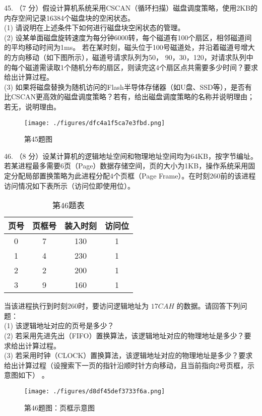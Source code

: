 45. （7 分）假设计算机系统采用CSCAN（循环扫描）磁盘调度策略，使用2KB的内存空间记录16384个磁盘块的空闲状态。 \\
(1) 请说明在上述条件下如何进行磁盘块空闲状态的管理。 \\
(2) 设某单面磁盘旋转速度为每分钟6000转，每个磁道有100个扇区，相邻磁道间的平均移动时间为1ms。
若在某时刻，磁头位于100号磁道处，并沿着磁道号增大的方向移动（如下图所示），磁道号请求队列为50，
90，30，120，对请求队列中的每个磁道需读取1个随机分布的扇区，则读完这4个扇区点共需要多少时间？要求给出计算过程。 \\
(3) 如果将磁盘替换为随机访问的Flash半导体存储器（如U盘、SSD等），是否有比CSCAN更高效的磁盘调度策略？若有，给出磁盘调度策略的名称并说明理由；若无，说明理由。
\begin{figure}[ht]
\centering
\texttt{[image: ./figures/dfc4a1f5ca7e3fbd.png]}
\caption{第45题图} \label{fig_CSN10_7}
\end{figure}

46. （8 分）设某计算机的逻辑地址空间和物理地址空间均为64KB，按字节编址。若某进程最多需要6页（Page）数据存储空间，页的大小为1KB，操作系统采用固定分配局部置换策略为此进程分配4个页框（Page Frame）。在时刻260前的该进程访问情况如下表所示（访问位即使用位）。 \\
\begin{table}[ht]
\centering
\caption{第46题表}\label{tab_CSN10_1}
\begin{tabular}{|c|c|c|c|}
\hline
页号 & 页框号 & 装入时刻 & 访问位 \\
\hline
0 & 7 & 130 & 1 \\
\hline
1 & 4 & 230 & 1 \\
\hline
2 & 2 & 200 & 1 \\
\hline
3 & 9 & 160 & 1 \\
\hline
\end{tabular}
\end{table}

当该进程执行到时刻260时，要访问逻辑地址为 $17CAH$ 的数据。请回答下列问题： \\
(1) 该逻辑地址对应的页号是多少？ \\
(2) 若采用先进先出（FIFO）置换算法，该逻辑地址对应的物理地址是多少？要求给出计算过程。 \\
(3) 若采用时钟（CLOCK）置换算法，该逻辑地址对应的物理地址是多少？要求给出计算过程（设搜索下一页的指针沿顺时针方向移动，且当前指向2号页框，示意图如下） 。
\begin{figure}[ht]
\centering
\texttt{[image: ./figures/d8df45def3733f6a.png]}
\caption{第46题图：页框示意图} \label{fig_CSN10_8}
\end{figure}

